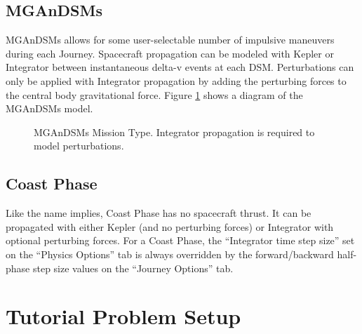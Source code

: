 \documentclass[11pt]{article}
\begin{document}
\subsection{MGAnDSMs}
\label{sec:mgandsms}

\acf{MGAnDSMs} allows for some user-selectable number of impulsive maneuvers during each Journey. Spacecraft propagation can be modeled with Kepler or Integrator between instantaneous delta-v events at each \ac{DSM}. Perturbations can only be applied with Integrator propagation by adding the perturbing forces to the central body gravitational force. Figure \ref{fig:mgandsms_mission_type} shows a diagram of the \ac{MGAnDSMs} model.

\begin{figure}[H]
	\centering
	\caption{\label{fig:mgandsms_mission_type}\ac{MGAnDSMs} Mission Type. Integrator propagation is required to model perturbations.}
\end{figure}

\subsection{Coast Phase}
\label{sec:coast_phase}

Like the name implies, Coast Phase has no spacecraft thrust. It can be propagated with either Kepler (and no perturbing forces) or Integrator with optional perturbing forces. For a Coast Phase, the ``Integrator time step size'' set on the ``Physics Options'' tab is always overridden by the forward/backward half-phase step size values on the ``Journey Options'' tab.

\section{Tutorial Problem Setup}
\label{sec:tutorial_problem_setup}
\end{document}
